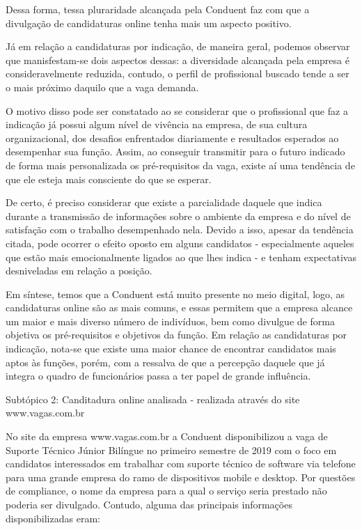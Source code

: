 \documentclass[12pt]{article}
\begin{document}
Dessa forma, tessa pluraridade alcançada pela Conduent faz com que a divulgação de candidaturas online tenha mais um aspecto positivo. 

Já em relação a candidaturas por indicação, de maneira geral, podemos observar que manisfestam-se dois aspectos dessas: a diversidade alcançada pela empresa é consideravelmente reduzida, contudo, o perfil de profissional buscado tende a ser o mais próximo daquilo que a vaga demanda. 

O motivo disso pode ser constatado ao se considerar que o profissional que faz a indicação já possui algum nível de vivência na empresa, de sua cultura organizacional, dos desafios enfrentados diariamente e resultados esperados ao desempenhar sua função. Assim, ao conseguir transmitir para o futuro indicado de forma mais personalizada os pré-requisitos da vaga, existe aí uma tendência de que ele esteja mais consciente do que se esperar.  

De certo, é preciso considerar que existe a parcialidade daquele que indica durante a transmissão de informações sobre o ambiente da empresa e do nível de satisfação com o trabalho desempenhado nela. Devido a isso, apesar da tendência citada, pode ocorrer o efeito oposto em alguns candidatos - especialmente aqueles que estão mais emocionalmente ligados ao que lhes indica - e tenham expectativas desniveladas em relação a posição.

Em síntese, temos que a Conduent está muito presente no meio digital, logo, as candidaturas online são as mais comuns, e essas permitem que a empresa alcance um maior e mais diverso número de indivíduos, bem como divulgue de forma objetiva os pré-requisitos e objetivos da função. Em relação as candidaturas por indicação, nota-se que existe uma maior chance de encontrar candidatos mais aptos às funções, porém, com a ressalva de que a percepção daquele que já integra o quadro de funcionários passa a ter papel de grande influência.  
 
Subtópico 2: Canditadura online analisada - realizada através do site www.vagas.com.br
 
No site da empresa www.vagas.com.br a Conduent disponibilizou a vaga de Suporte Técnico Júnior Bilíngue no primeiro semestre de 2019 com o foco em candidatos interessados em trabalhar com suporte técnico de software via telefone para uma grande empresa do ramo de dispositivos mobile e desktop. Por questões de compliance, o nome da empresa para a qual o serviço seria prestado não poderia ser divulgado. Contudo, alguma das principais informações disponibilizadas eram: 
 
\end{document}
